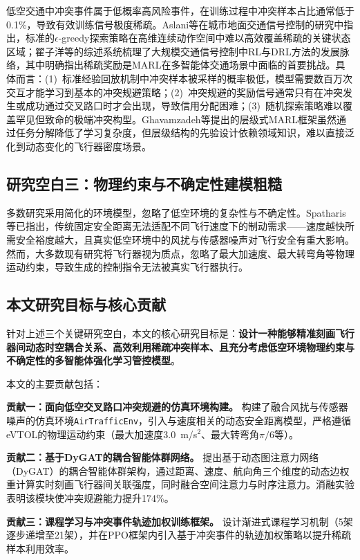 \documentclass[12pt,a4paper,UTF8]{ctexart}
\begin{document}
低空交通中冲突事件属于低概率高风险事件，在训练过程中冲突样本占比通常低于0.1\%，导致有效训练信号极度稀疏。Aslani等在城市地面交通信号控制的研究中指出，标准的$\epsilon$-greedy探索策略在高维连续动作空间中难以高效覆盖稀疏的关键状态区域\cite{ref10}；翟子洋等的综述系统梳理了大规模交通信号控制中RL与DRL方法的发展脉络，其中明确指出稀疏奖励是MARL在多智能体交通场景中面临的首要挑战\cite{ref11}。具体而言：(1)~标准经验回放机制中冲突样本被采样的概率极低，模型需要数百万次交互才能学习到基本的冲突规避策略；(2)~冲突规避的奖励信号通常只有在冲突发生或成功通过交叉路口时才会出现，导致信用分配困难；(3)~随机探索策略难以覆盖罕见但致命的极端冲突构型。Ghavamzadeh等提出的层级式MARL框架虽然通过任务分解降低了学习复杂度\cite{ref12}，但层级结构的先验设计依赖领域知识，难以直接泛化到动态变化的飞行器密度场景。

\subsection{研究空白三：物理约束与不确定性建模粗糙}

多数研究采用简化的环境模型，忽略了低空环境的复杂性与不确定性。Spatharis等已指出，传统固定安全距离无法适配不同飞行速度下的制动需求——速度越快所需安全裕度越大，且真实低空环境中的风扰与传感器噪声对飞行安全有重大影响\cite{ref7}。然而，大多数现有研究将飞行器视为质点，忽略了最大加速度、最大转弯角等物理运动约束，导致生成的控制指令无法被真实飞行器执行。

\subsection{本文研究目标与核心贡献}

针对上述三个关键研究空白，本文的核心研究目标是：\textbf{设计一种能够精准刻画飞行器间动态时空耦合关系、高效利用稀疏冲突样本、且充分考虑低空环境物理约束与不确定性的多智能体强化学习管控模型}。

本文的主要贡献包括：

\textbf{贡献一：面向低空交叉路口冲突规避的仿真环境构建。} 构建了融合风扰与传感器噪声的仿真环境\texttt{AirTrafficEnv}，引入与速度相关的动态安全距离模型，严格遵循eVTOL的物理运动约束（最大加速度3.0~m/s$^2$、最大转弯角$\pi/6$等）。

\textbf{贡献二：基于DyGAT的耦合智能体群网络。} 提出基于动态图注意力网络（DyGAT）的耦合智能体群架构，通过距离、速度、航向角三个维度的动态边权重计算实时刻画飞行器间关联强度，同时融合空间注意力与时序注意力。消融实验表明该模块使冲突规避能力提升174\%。

\textbf{贡献三：课程学习与冲突事件轨迹加权训练框架。} 设计渐进式课程学习机制（5架逐步递增至21架），并在PPO框架内引入基于冲突事件的轨迹加权策略以提升稀疏样本利用效率。
\end{document}
